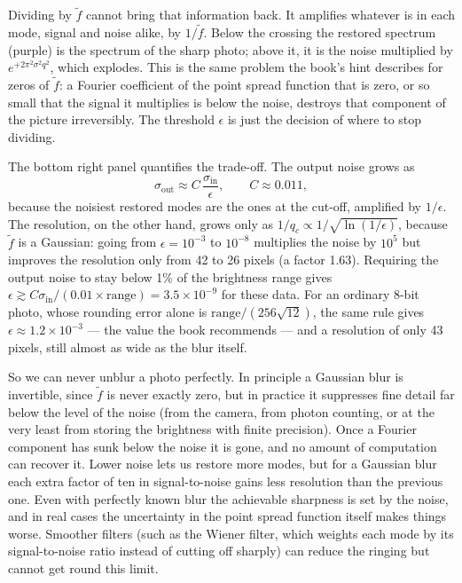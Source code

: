 \documentclass[11pt]{article}
\newcommand{\eps}{\epsilon}
\begin{document}
Dividing by $\tilde f$ cannot bring that information back. It amplifies
whatever is in each mode, signal and noise alike, by $1/\tilde f$. Below the
crossing the restored spectrum (purple) is the spectrum of the sharp photo;
above it, it is the noise multiplied by $e^{+2\pi^2\sigma^2q^2}$, which explodes.
This is the same problem the book's hint describes for zeros of $\tilde f$: a
Fourier coefficient of the point spread function that is zero, or so small that
the signal it multiplies is below the noise, destroys that component of the
picture irreversibly. The threshold $\eps$ is just the decision of where to stop
dividing.

The bottom right panel quantifies the trade-off. The output noise grows as
\[
\sigma_{\mathrm{out}} \approx C\,\frac{\sigma_{\mathrm{in}}}{\eps},
\qquad C \approx 0.011,
\]
because the noisiest restored modes are the ones at the cut-off, amplified by
$1/\eps$. The resolution, on the other hand, grows only as
$1/q_c \propto 1/\sqrt{\ln(1/\eps)}$, because $\tilde f$ is a Gaussian: going
from $\eps=10^{-3}$ to $10^{-8}$ multiplies the noise by $10^5$ but improves
the resolution only from 42 to 26 pixels (a factor 1.63). Requiring the
output noise to stay below 1\% of the brightness range gives
$\eps \gtrsim C\sigma_{\mathrm{in}}/(0.01\times\text{range}) = 3.5\times10^{-9}$ for these
data. For an ordinary 8-bit photo, whose rounding error alone is
$\text{range}/(256\sqrt{12})$, the same rule gives $\eps\approx1.2\times10^{-3}$
--- the value the book recommends --- and a resolution of only 43 pixels, still
almost as wide as the blur itself.

So we can never unblur a photo perfectly. In principle a Gaussian blur is
invertible, since $\tilde f$ is never exactly zero, but in practice it suppresses
fine detail far below the level of the noise (from the camera, from photon counting, or at the very least
from storing the brightness with finite precision). Once a Fourier component
has sunk below the noise it is gone, and no amount of computation can recover
it. Lower noise lets us restore more modes, but for a Gaussian blur each extra
factor of ten in signal-to-noise gains less resolution than the previous one.
Even with perfectly known blur the achievable sharpness is set by the noise,
and in real cases the uncertainty in the point spread function itself makes
things worse. Smoother filters (such as the Wiener filter, which weights each
mode by its signal-to-noise ratio instead of cutting off sharply) can reduce
the ringing but cannot get round this limit.
\end{document}
